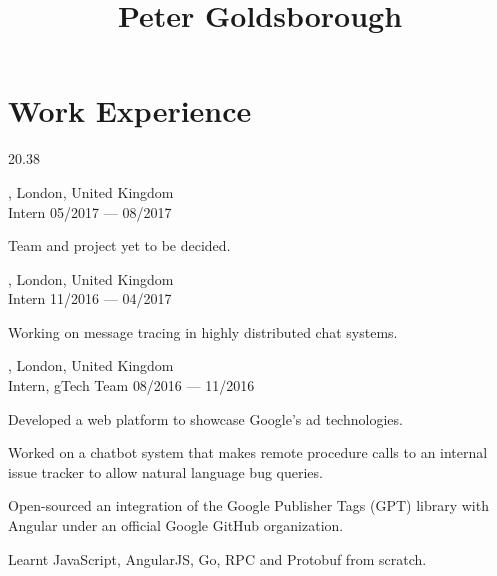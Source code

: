 




\begin{header}
	\title{Peter Goldsborough}
	\separate
	\separate
\end{header}

\section{Work Experience}{2}{0.38}

\begin{entry}
	{, London, United Kingdom}
	{\\Intern}
	{05/2017 --- 08/2017}
	\item Team and project yet to be decided.
\end{entry}

\begin{entry}
	{, London, United Kingdom}
	{\\Intern}
	{11/2016 --- 04/2017}
	\item Working on message tracing in highly distributed chat systems.
\end{entry}

\begin{entry}
	{, London, United Kingdom}
	{\\Intern, gTech Team}
	{08/2016 --- 11/2016}
  \item Developed a web platform to showcase Google’s ad technologies.
  \item Worked on a chatbot system that makes remote procedure calls to an internal issue tracker to allow natural language bug queries.
  \item Open-sourced an integration of the Google Publisher Tags (GPT) library with Angular under an official Google GitHub organization.
  \item Learnt JavaScript, AngularJS, Go, RPC and Protobuf from scratch.
\end{entry}


